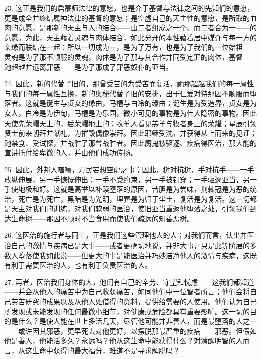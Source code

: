 23. 这正是我们的启蒙师法律的意愿，也是介于基督与法律之间的先知们的意愿，更是成全并终结属神法律的基督的意愿；是空虚自己的天主性的意愿，是所取的血肉的意愿，是那新的天主与人的结合——由二者组成之一个、而二者合为一——的意愿。为此，天主藉着灵魂与肉体结合，如此分开的本性藉着居中媒介与每一方的亲缘而联结在一起：所以一切成为一，是为了万有，也是为了我们的一位始祖——灵魂是为了那不顺服的灵魂，肉体是为了那与其合作并同受定罪的肉体，基督——祂超越并远离罪恶——是为了那成了罪恶奴仆的亚当。\par

24. 因此，新的代替了旧的，那曾受苦的为受苦而复活，祂那超越我们的每一属性与我们的每一属性互换，新的奥秘代替了旧的安排，出于仁爱对待那因不顺服而堕落者。这就是诞生与贞女的缘由，马槽与白冷的缘由；诞生是为受造界，贞女是为女人，白冷是为伊甸，马槽是为乐园，微小可见的事物是为伟大隐密的事物。因此天使先荣耀天上的，后荣耀地上的；牧羊人看见羔羊与牧者身上的荣耀；星辰引领贤士前来朝拜并献礼，为摧毁偶像崇拜。因此耶稣受洗，并获得从上而来的见证；祂禁食、受试探，并战胜了那曾战胜者。因此魔鬼被驱逐、疾病得医治，那大能的宣讲托付给卑微的人，并由他们成功传扬。\par

25. 因此，外邦人喧嚷，万民妄想空虚之事；因此，树对抗树，手对抗手——一手放纵伸展，另一手慷慨伸出；一手不受约束，另一手被钉穿；一手驱逐亚当，另一手使地极和好。这就是高举以补赎堕落的原因，苦胆是为尝味，荆棘冠是为恶的统治，死亡是为死亡，黑暗是为光明，埋葬是为归于尘土，复活是为复活。这一切都是天主对我们的训练，对我们软弱的医治，使旧亚当重返他堕落之处，引领我们到达生命树——那因不顺时不当食用而使我们疏远的知善恶树。\par

26. 这医治的施行者与同工，正是我们这些管理他人的人；对我们而言，认出并医治自己的激情与疾病已是大事——或者更确切地说，并非大事，只是此等阶层的多数人堕落使我如此说——但更大的事是能医治并巧妙洁净他人的激情与疾病，这既有利于需要医治的人，也有利于负责医治的人。\par

27. 再者，医治我们身体的人，他们有自己的辛劳、守望和忧虑——这我们都知道——并会从他人的痛苦中为自己收获痛苦，如同他们中一位智者所言；他们会将自己劳苦研究的成果以及从他人处借得的资料，提供给需要的人使用。他们认为自己所发现或未能发现的任何最微小细节，对健康或危险都具有重要影响。这一切的目的是什么？是使人能在世上多活几天，尽管他可能并非善人，而是最堕落的人之一——或许因其邪恶，更早死去对他更好，以摆脱那最严重的疾病——邪恶。但假如他是善人，他能活多久？永远吗？他从这生命中能获得什么？对清醒明智的人而言，从这生命中获得的最大福分，难道不是寻求解脱吗？\par

